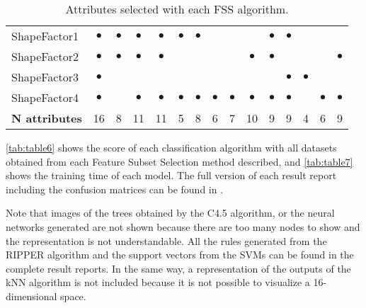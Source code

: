 \documentclass[a4paper,11pt]{article}
\begin{document}
\begin{table}[h]
\begin{tabular}{||l|c|c|c|c|c|c|c|c|c|c|c|c|c|c||}
    ShapeFactor1 & $\bullet$ & $\bullet$ & $\bullet$ & $\bullet$ & $\bullet$ & $\bullet$ & & & & $\bullet$ & $\bullet$ & & & \\
    ShapeFactor2 & $\bullet$ & $\bullet$ & $\bullet$ & $\bullet$ & & & & & $\bullet$ & $\bullet$ & & & & $\bullet$\\
    ShapeFactor3 & $\bullet$ & & & & & & & & & & $\bullet$ & $\bullet$ & & \\
	ShapeFactor4 & $\bullet$ & & $\bullet$ & $\bullet$ & $\bullet$ & $\bullet$ & $\bullet$ & $\bullet$ & $\bullet$ & $\bullet$ & $\bullet$ & & $\bullet$ & $\bullet$\\
    \hline
    \textbf{N attributes} & 16 & 8 & 11 & 11 & 5 & 8 & 6 & 7 & 10 & 9 & 9 & 4 & 6 & 9\\
    \hline
\end{tabular}
\caption{Attributes selected with each FSS algorithm.}
\label{tab:table5}
\end{table}


\autoref{tab:table6} shows the score of each classification algorithm with all datasets obtained from each Feature Subset Selection method described, and \autoref{tab:table7} shows the training time of each model. The full version of each result report including the confusion matrices can be found in \cite{repo}.

Note that images of the trees obtained by the C4.5 algorithm, or the neural networks generated are not shown because there are too many nodes to show and the representation is not understandable. All the rules generated from the RIPPER algorithm and the support vectors from the SVMs can be found in the complete result reports. In the same way, a representation of the outputs of the kNN algorithm is not included because it is not possible to visualize a 16-dimensional space.
\end{document}
